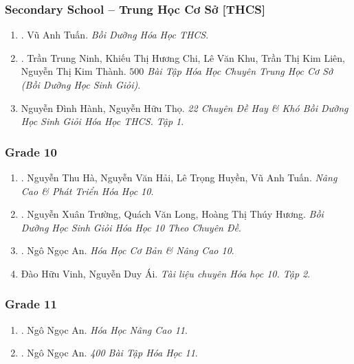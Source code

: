 \documentclass{article}
\begin{document}
\subsubsection{Secondary School -- Trung Học Cơ Sở [THCS]}

\begin{enumerate}
	\item \cite{Tuan2022}. Vũ Anh Tuấn. \textit{Bồi Dưỡng Hóa Học THCS}.\hfill{\sf[reading]}
	\item \cite{Ninh_Chi_Khu_Lien_Thanh2019}. Trần Trung Ninh, Khiếu Thị Hương Chi, Lê Văn Khu, Trần Thị Kim Liên, Nguyễn Thị Kim Thành. \textit{$500$ Bài Tập Hóa Học Chuyên Trung Học Cơ Sở (Bồi Dưỡng Học Sinh Giỏi)}.\hfill{\sf[reading]}
	\item Nguyễn Đình Hành, Nguyễn Hữu Thọ. \textit{22 Chuyên Đề Hay \& Khó Bồi Dưỡng Học Sinh Giỏi Hóa Học THCS. Tập 1}.
\end{enumerate}

\subsubsection{Grade 10}

\begin{enumerate}
	\item \cite{Ha_Hai_Huyen_Tuan2022}. Nguyễn Thu Hà, Nguyễn Văn Hải, Lê Trọng Huyền, Vũ Anh Tuấn. \textit{Nâng Cao \& Phát Triển Hóa Học 10}.\hfill{\sf[reading]}
	\item \cite{Truong_Long_Huong_bdhsg_Hoa_Hoc_10}. Nguyễn Xuân Trường, Quách Văn Long, Hoàng Thị Thúy Hương. \textit{Bồi Dưỡng Học Sinh Giỏi Hóa Học 10 Theo Chuyên Đề}.\hfill{\sf[reading]}
	\item \cite{An_Hoa_Hoc_co_ban_nang_cao_10}. Ngô Ngọc An. \textit{Hóa Học Cơ Bản \& Nâng Cao 10}.\hfill{\sf[reading]}
	\item Đào Hữu Vinh, Nguyễn Duy Ái. \textit{Tài liệu chuyên Hóa học 10. Tập 2}.\hfill{\sf[reading]}
\end{enumerate}

\subsubsection{Grade 11}

\begin{enumerate}
	\item \cite{An_Hoa_Hoc_nang_cao_11}. Ngô Ngọc An. \textit{Hóa Học Nâng Cao 11}.\hfill{\sf[reading]}
	\item \cite{An_400_BT_Hoa_Hoc_11}. Ngô Ngọc An. \textit{400 Bài Tập Hóa Học 11}.\hfill{\sf[reading]}
\end{enumerate}
\end{document}
